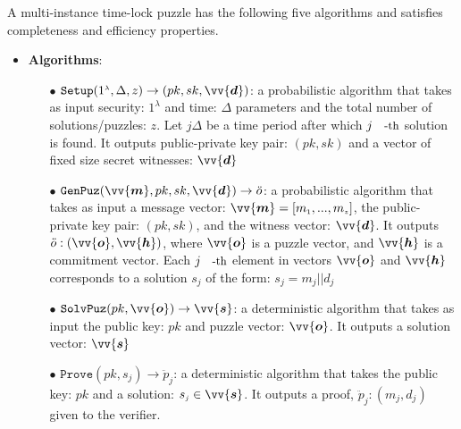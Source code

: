 \begin{definition} A multi-instance time-lock puzzle has the following  five algorithms and satisfies completeness and efficiency properties. 



\begin{itemize}[leftmargin=.43cm]
\item \textbf{Algorithms}:
\begin{itemize} 
\item[$\bullet$]$\mathtt{Setup}(1^{\scriptscriptstyle\lambda},\Delta,z)\rightarrow (pk,sk,\vv{\bm{d}})$:  a probabilistic algorithm that takes as input  security: $1^{\scriptscriptstyle\lambda}$ and time:  $\Delta$ parameters and the total number of solutions/puzzles: $z$. Let     $j \Delta$ be a time period after which $j\text{\small{-th}}$ solution is found.   It outputs public-private key pair: $(pk,sk)$ and a vector of fixed size  secret witnesses: $\vv{\bm{d}}$


\item[$\bullet$]$\mathtt {GenPuz}(\vv{\bm{m}}, pk, sk,\vv{\bm{d}})\rightarrow \ddot{o}$:  a probabilistic algorithm that takes as  input  a  message vector: $\vv{\bm{m}}=[m_{\scriptscriptstyle 1},...,m_{\scriptscriptstyle z}]$,  the public-private key pair: $(pk,sk)$, and the witness vector: $\vv{\bm{d}}$. It  outputs $\ddot{o}:(\vv{\bm{o}},\vv{\bm{h}})$, where $\vv{\bm{o}}$ is a puzzle vector, and $\vv{\bm{h}}$ is a commitment vector. Each $j\text{\small{-th}}$ element in  vectors $\vv{\bm{o}}$ and $\vv{\bm{h}}$ corresponds to a solution $s_{\scriptscriptstyle j}$ of the form: $s_{\scriptscriptstyle j}=m_{\scriptscriptstyle j}||d_{\scriptscriptstyle j}$ %
 
\item[$\bullet$]$\mathtt {SolvPuz}(pk,\vv{\bm{o}})\rightarrow \vv{\bm{s}}$:   a deterministic algorithm that takes as input  the public key: $pk$ and  puzzle vector: $\vv{\bm{o}}$. It outputs a solution vector: $\vv{\bm{s}}$

\item[$\bullet$]$\mathtt {Prove}(pk,s_{\scriptscriptstyle j})\rightarrow \ddot{p}_{\scriptscriptstyle j}$:  a deterministic algorithm that takes the public key: $pk$ and a solution: $s_{\scriptscriptstyle j}\in\vv{\bm{s}}$. It outputs a proof, $\ddot{p}_{\scriptscriptstyle j}:(m_{\scriptscriptstyle j},d_{\scriptscriptstyle j})$ given to the verifier.


\end{itemize}
\end{itemize}
\end{definition}
